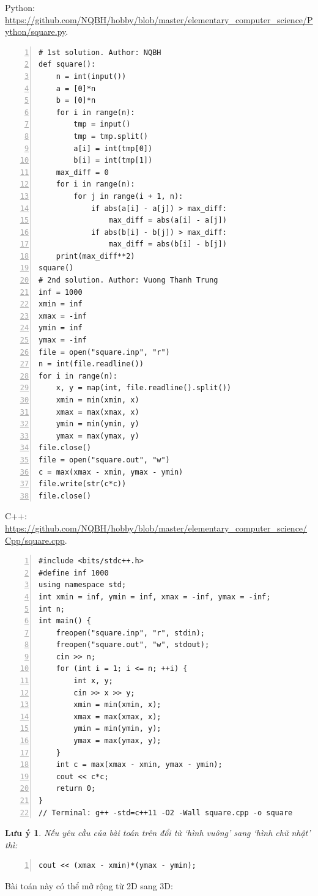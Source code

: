 \documentclass{article}
\newtheorem{luuy}{Lưu ý}
\begin{document}
Python: \url{https://github.com/NQBH/hobby/blob/master/elementary_computer_science/Python/square.py}.
\begin{Verbatim}[numbers=left,xleftmargin=5mm]
# 1st solution. Author: NQBH
def square():
    n = int(input())
    a = [0]*n
    b = [0]*n
    for i in range(n):
        tmp = input()
        tmp = tmp.split()
        a[i] = int(tmp[0])
        b[i] = int(tmp[1])
    max_diff = 0
    for i in range(n):
        for j in range(i + 1, n):
            if abs(a[i] - a[j]) > max_diff:
                max_diff = abs(a[i] - a[j])
            if abs(b[i] - b[j]) > max_diff:
                max_diff = abs(b[i] - b[j])
    print(max_diff**2)
square()
# 2nd solution. Author: Vuong Thanh Trung
inf = 1000
xmin = inf
xmax = -inf
ymin = inf
ymax = -inf
file = open("square.inp", "r")
n = int(file.readline())
for i in range(n):
    x, y = map(int, file.readline().split())
    xmin = min(xmin, x)
    xmax = max(xmax, x)
    ymin = min(ymin, y)
    ymax = max(ymax, y)
file.close()
file = open("square.out", "w")
c = max(xmax - xmin, ymax - ymin)
file.write(str(c*c))
file.close()
\end{Verbatim}
C++: \url{https://github.com/NQBH/hobby/blob/master/elementary_computer_science/Cpp/square.cpp}.
\begin{Verbatim}[numbers=left,xleftmargin=5mm]
#include <bits/stdc++.h>
#define inf 1000
using namespace std;
int xmin = inf, ymin = inf, xmax = -inf, ymax = -inf;
int n;
int main() {
    freopen("square.inp", "r", stdin);
    freopen("square.out", "w", stdout);
    cin >> n;
    for (int i = 1; i <= n; ++i) {
        int x, y;
        cin >> x >> y;
        xmin = min(xmin, x);
        xmax = max(xmax, x);
        ymin = min(ymin, y);
        ymax = max(ymax, y);
    }
    int c = max(xmax - xmin, ymax - ymin);
    cout << c*c;
    return 0;
}
// Terminal: g++ -std=c++11 -O2 -Wall square.cpp -o square
\end{Verbatim}

\begin{luuy}
	Nếu yêu cầu của bài toán trên đổi từ `hình vuông' sang `hình chữ nhật' thì:
	\begin{Verbatim}[numbers=left,xleftmargin=5mm]
		cout << (xmax - xmin)*(ymax - ymin);
	\end{Verbatim}
\end{luuy}
Bài toán này có thể mở rộng từ 2D sang 3D:
\end{document}
